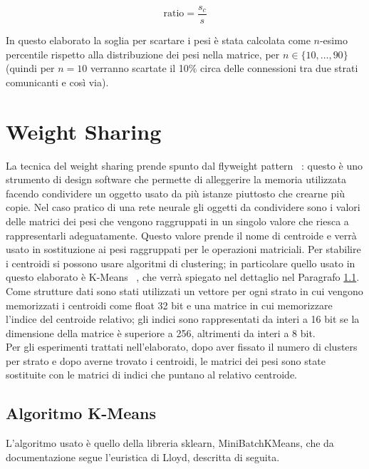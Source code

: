 \documentclass[12pt]{report}
\begin{document}
\begin{equation}
\mathrm{ratio} = \frac{s_c}{s}
\label{compressionRatio}
\end{equation}

In questo elaborato la soglia per scartare i pesi è stata calcolata come $n$-esimo percentile rispetto alla distribuzione dei pesi nella matrice, per $n \in \{10, \dots, 90 \}$ (quindi per $n=10$ verranno scartate il 10\% circa delle connessioni tra due strati comunicanti e così via).

\section{Weight Sharing}

La tecnica del weight sharing prende spunto dal flyweight pattern ~\cite{GOF}: questo è uno strumento di design software che permette di alleggerire la memoria utilizzata facendo condividere un oggetto usato da più istanze piuttosto che crearne più copie.
Nel caso pratico di una rete neurale gli oggetti da condividere sono i valori delle matrici dei pesi che vengono raggruppati in un singolo valore che riesca a rappresentarli adeguatamente. Questo valore prende il nome di centroide e verrà usato in sostituzione ai pesi raggruppati per le operazioni matriciali. 
Per stabilire i centroidi si possono usare algoritmi di clustering; in particolare quello usato in questo elaborato è K-Means ~\cite{KMeans}, che verrà spiegato nel dettaglio nel Paragrafo \ref{kmeans}. \\
Come strutture dati sono stati utilizzati un vettore per ogni strato in cui vengono memorizzati i centroidi come float 32 bit e una matrice in cui memorizzare l'indice del centroide relativo; gli indici sono rappresentati da interi a 16 bit se la dimensione della matrice è superiore a 256, altrimenti da interi a 8 bit. \\
Per gli esperimenti trattati nell'elaborato, dopo aver fissato il numero di clusters per strato e dopo averne trovato i centroidi, le matrici dei pesi sono state sostituite con le matrici di indici che puntano al relativo centroide. 

\subsection{Algoritmo K-Means}\label{kmeans}
L’algoritmo usato è quello della libreria sklearn, MiniBatchKMeans, che da documentazione segue l’euristica di Lloyd, descritta di seguita.
\end{document}
